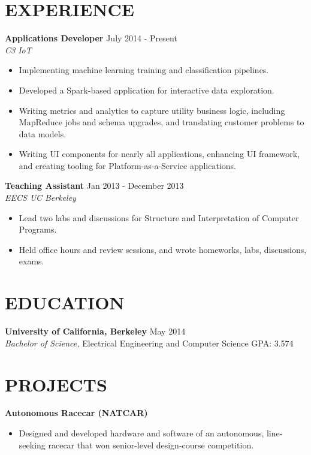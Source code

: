 \documentclass[line,margin]{res}
\begin{document}
\address{richard.hwang201@gmail.com $|$ (973) 647-5056}
\address{https://github.com/rhwang201}

\begin{resume}
\section{EXPERIENCE}
{\bf Applications Developer} \hfill {\small July 2014 - Present} \\
{\it C3 IoT}
\begin{itemize} \itemsep -1pt
  \item Implementing machine learning training and classification pipelines.
  \item Developed a Spark-based application for interactive data exploration.
  \item Writing metrics and analytics to capture utility business logic, including
      MapReduce jobs and schema upgrades, and translating customer problems to data models.
  \item Writing UI components for nearly all applications, enhancing UI framework, and
        creating tooling for Platform-as-a-Service applications.
\end{itemize}

{\bf Teaching Assistant} \hfill {\small Jan 2013 - December 2013} \\
{\it EECS UC Berkeley}
\begin{itemize}  \itemsep -1pt
  \item Lead two labs and discussions for Structure and Interpretation of Computer
        Programs.
  \item Held office hours and review sessions, and wrote homeworks, labs, discussions,
        exams.
\end{itemize}


\section{EDUCATION}
{\bf University of California, Berkeley} \hfill {\small May 2014}\\
{\sl Bachelor of Science,} Electrical Engineering and Computer Science \hfill GPA: 3.574


\section{PROJECTS}
{\bf Autonomous Racecar (NATCAR)}
\begin{itemize} \itemsep - 1pt
  \item Designed and developed hardware and software of an autonomous, line-seeking
        racecar that won senior-level design-course competition.
\end{itemize}


\end{resume}
\end{document}
